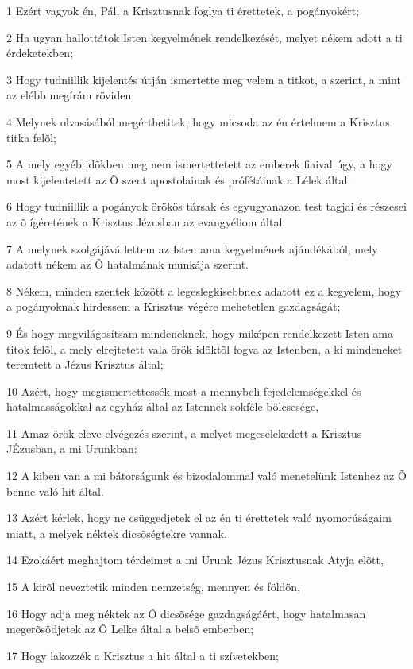 \par 1 Ezért vagyok én, Pál, a Krisztusnak foglya ti érettetek, a pogányokért;
\par 2 Ha ugyan hallottátok Isten kegyelmének rendelkezését, melyet nékem adott a ti érdeketekben;
\par 3 Hogy tudniillik kijelentés útján ismertette meg velem a titkot, a szerint, a mint az elébb megírám röviden,
\par 4 Melynek olvasásából megérthetitek, hogy micsoda az én értelmem a Krisztus titka felõl;
\par 5 A mely egyéb idõkben meg nem ismertettetett az emberek fiaival úgy, a hogy most kijelentetett az Õ szent apostolainak és prófétáinak a Lélek által:
\par 6 Hogy tudniillik a pogányok örökös társak és egyugyanazon test tagjai és részesei az õ ígéretének a Krisztus Jézusban az evangyéliom által.
\par 7 A melynek szolgájává lettem az Isten ama kegyelmének ajándékából, mely adatott nékem az Õ hatalmának munkája szerint.
\par 8 Nékem, minden szentek között a legeslegkisebbnek adatott ez a kegyelem, hogy a pogányoknak hirdessem a Krisztus végére mehetetlen gazdagságát;
\par 9 És hogy megvilágosítsam mindeneknek, hogy miképen rendelkezett Isten ama titok felõl, a mely elrejtetett vala örök idõktõl fogva az Istenben, a ki mindeneket teremtett a Jézus Krisztus által;
\par 10 Azért, hogy megismertettessék most a mennybeli fejedelemségekkel és hatalmasságokkal az egyház által az Istennek sokféle bölcsesége,
\par 11 Amaz örök eleve-elvégezés szerint, a melyet megcselekedett a Krisztus JÉzusban, a mi Urunkban:
\par 12 A kiben van a mi bátorságunk és bizodalommal való menetelünk Istenhez az Õ benne való hit által.
\par 13 Azért kérlek, hogy ne csüggedjetek el az én ti érettetek való nyomorúságaim miatt, a melyek néktek dicsõségtekre vannak.
\par 14 Ezokáért meghajtom térdeimet a mi Urunk Jézus Krisztusnak Atyja elõtt,
\par 15 A kirõl neveztetik minden nemzetség, mennyen és földön,
\par 16 Hogy adja meg néktek az Õ dicsõsége gazdagságáért, hogy hatalmasan megerõsödjetek az Õ Lelke által a belsõ emberben;
\par 17 Hogy lakozzék a Krisztus a hit által a ti szívetekben;
